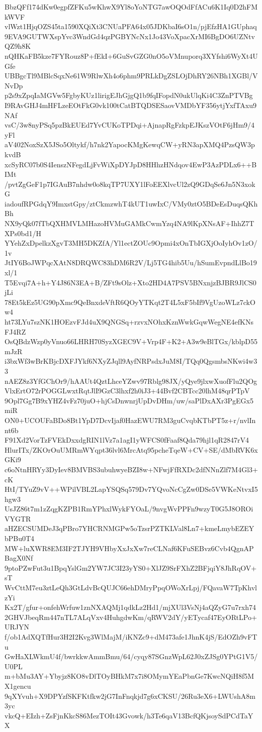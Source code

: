 BbzQFf174dKw0egpfZFKu5wKhwX9Yl8oYoNTG7awOQOdFfACu6K1Iq0D2hFMkWVF
vlWzt1HjqOZS45ta1590XQiXt3CNUaPFA64x05JDKbaI6sO1n/pjEfzHA1GUphaq
9EVA9GUTWXspYvc3WndGd4qzPGBYNcNx1Jo43VoXpacXrMI6BgDO6UZNtvQZ9h8K
nQHKaFB5kze7FYRouz8P+fEkI+6GuSvGZG0nO5oVMnuporq3XYfshi6WyXt4UGfe
UBBgcTl9MBlcSqxNe61W9RlwXh4o6phm9PRLkDgZSLOjDhRY26NBh1XGBl/VNvDp
p2s9xZpqIaMGVw5FgbyKUz1lirigEJhGjgQ1b9fqIFopdN0ukUlqKi4C3ZnPTVBg
I9RAvGHJ4mHFLzeEOtFkG0vk100tCatBTQDSESaovVMDbYF356ytjYxfTAxu9NAf
vsC/3w8nyPSq5pzBkEUEd7YvCUKoTPDqi+AjnapRgFzkpEJKszVOtF6jHm9/4yFl
aV402NoxSzX5JSo5Oltykf/h7nk2YapocKMgKewqCW+yRN3apXMQ4PzsQW3pkvdB
xcSyRC07b0S4IenszNFegdLjFvWiXpDYJpD8HHhzHNdqov4EwP3AzPDLx6++BIMt
/pvtZgGeF1p7IGAuB7nhdw0o8kqTP7UXY1lFoEEXlvcUl2zQ9GDqSe6Jn5N3xokG
iadoufRPGdqY9ImxstGpy/ztCkmzwhT4kUT1uwIxC/VMy0ztO5BDeEsDuqsQKhBh
NX9yQk07fTbQXHMVLMHazoHVMuGAMkCwmYzq4NA9lKpXNsAF+IhhZ7TXPs0bd1/H
YYehZxDpelkzXgvT3MH5DKZfA/Yl1ectZOUc9Opmi4xOnTbIGXjOoIyhOv1zO/1v
JtIY6BoJWPqcXAtN8DRQWC83hDM6R2V/Lj5TG4hib5Uu/hSumEvpndLlBo19xl/1
T5Evqi7A+h+Y4J86N3EA+B/ZFt9sOlz+Xto2HD4A7PSV5BNxnjzBJBR9JlCS0jLi
78Et5kEz5UG90pXmc9QeBnxdeVftR6QOyYTKqt2T4L5xF5bIf9VgUzoWLz7ckOw4
ht73LYu7szNK1HOEzvFJd4uX9QNGSq+rzvxNOhxKznWwkGqwWegNE4efKNsFJ4RZ
OsQBdzWzp0yVnuo66LHRH70SyzXGEC9V+Vrp4F+K2+A3w9eBlTGx/kblpD55mJzR
i3bxWf3wBrKBjcDXFJYkf6NXyZJqll9AyfNRPsdxJuM8I/TQq0QgsmbsNKwi4w33
nAEZ8z3YfGChOr9/hAAUt4QztLhceYZwv97Rblg98JX/yQye9jlxwXuofFlu2QOg
VlxErtO72rPOGGLwxtRqtJlI9GzC3lhxf2h0iJ3+44Bvf2CBTcc20lhM48qrPTpV
9Opl7Gg7B9xYHZ4vFz70juO+hjCsDnwnrjUpDvDHm/uw/saPlDxAXr3PgEGx5miR
ON0+UCOUFaBDo8Bt1YpD7DcvIjaf0HazEWU7RM3guCvqbKTbPT5z+r/nvlInnt6b
F91Xd2VorTzFVEkDxxdgRIN1lVz7a1agI1yWFCS0fFaaf8Qda79hjl1qR2847rV4
HlurITx/ZKOrOuUMRmWYqpt36lvl6MrcAtq95pcheTqeW+CV+SE/dMbRVK6xGKi9
c6oNtnHRYy3DyIev8BMVBS3ubuhwyeBZI8w+NFwjFfRXDc2dfNNnZlf7M4Gl3+cK
HtI/TYuZ9vV++WPilVBL2LapYSQSq579Dv7YQvoNcCgZw0DSe5VWKeNtvxI5hgw3
UsJZ86t7m1zZqgKZPB1RmYPhxlWykFYOaL/9nvgWvPPFn9wzyT0G5J8OROiVYGTR
aHZECSUMDeJ3qPBro7YHCRNMGPw5oTzsrPZTKLVal8Ln7+kmeLmybEZEYbPBu0T4
MW+luXWR8EM3IF2TJYH9VHbyXxJxXw7reCLNaf6KFuSEBvz6Cvb4QgnAPBagX0Nf
9ptoPZwFut3u1BpqYslGm2YW7JC3I23yYS0+XlJZ9SrFXhZ2BFjqiY8JhRqOV+sT
WvCttM7eu3ztLeQh3GtLdvBcQUJC66ehDMryPpqOWoXrLpj/FQavaW7TpKhvlzYi
Kx2T/gfur+onfehWrfuw1znNXAQMj1qdkLz2Hd1/mjXUl3VsNj4aQZyG7u7rxh74
2GHVJbeqRm447nTL7ALqVxv4HuhgdwKm/qRWV2dY/yETycaf47EyORtLPo+URJYN
f/ob1AdXQTfHur3H2I2Kvg3WlMajM/iKNZc9+dM473afe1JhnK4jS/EdOZh9vFTu
GwHaXLWkmU4f/bwrkkwAmmBmu/64/cyqy87SGnzWpL62J0xZJSg0YPtG1V5/U0PL
m+bMu3AY+Ybyjz8KO8vDlTOyBHkM7x7i8OMymYEaPbnGe7KwcNQiH8f5MX1gencu
9qXYvuh+X9DPYzfSKFKtfkw2jG7InFnqkjd7g6xCKSU/26Ru3eX6+LWUshA8m3yc
vkcQ+EIzh+ZsFjnKkcS86MezTOIt43Gvowk/h3Te6qaV13BcfQKjsoySdPCdTaYX
